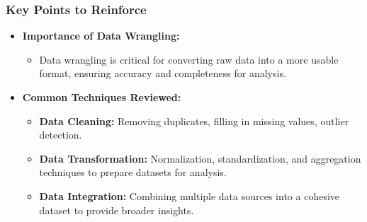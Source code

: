 \documentclass[aspectratio=169]{beamer}
\begin{document}
\begin{frame}[fragile]
    \frametitle{Key Points to Reinforce}
    \begin{itemize}
        \item \textbf{Importance of Data Wrangling:}
            \begin{itemize}
                \item Data wrangling is critical for converting raw data into a more usable format, ensuring accuracy and completeness for analysis.
            \end{itemize}
        \item \textbf{Common Techniques Reviewed:}
            \begin{itemize}
                \item \textbf{Data Cleaning:} Removing duplicates, filling in missing values, outlier detection.
                \item \textbf{Data Transformation:} Normalization, standardization, and aggregation techniques to prepare datasets for analysis.
                \item \textbf{Data Integration:} Combining multiple data sources into a cohesive dataset to provide broader insights.
            \end{itemize}
    \end{itemize}
\end{frame}
\end{document}
